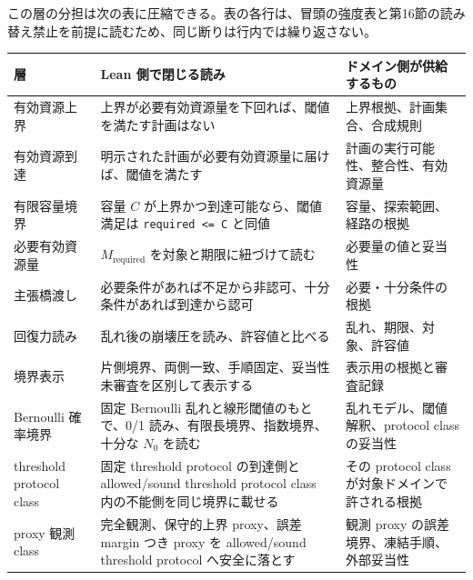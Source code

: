 \documentclass[12pt,a4paper]{article}
\begin{document}
この層の分担は次の表に圧縮できる。表の各行は、冒頭の強度表と第16節の読み替え禁止を前提に読むため、同じ断りは行内では繰り返さない。

{\def\LTcaptype{table} %
\begin{longtable}[]{@{}
  >{\raggedright\arraybackslash}p{}
  >{\raggedright\arraybackslash}p{}
  >{\raggedright\arraybackslash}p{}@{}}
\toprule\noalign{}
\begin{minipage}[b]{\linewidth}\raggedright
層
\end{minipage} & \begin{minipage}[b]{\linewidth}\raggedright
Lean 側で閉じる読み
\end{minipage} & \begin{minipage}[b]{\linewidth}\raggedright
ドメイン側が供給するもの
\end{minipage} \\
\midrule\noalign{}
\endhead
\bottomrule\noalign{}
\endlastfoot
有効資源上界 & 上界が必要有効資源量を下回れば、閾値を満たす計画はない & 上界根拠、計画集合、合成規則 \\
有効資源到達 & 明示された計画が必要有効資源量に届けば、閾値を満たす & 計画の実行可能性、整合性、有効資源量 \\
有限容量境界 & 容量 \(C\) が上界かつ到達可能なら、閾値満足は \texttt{required\ \textless{}=\ C} と同値 & 容量、探索範囲、経路の根拠 \\
必要有効資源量 & \(M_{\mathrm{required}}\) を対象と期限に紐づけて読む & 必要量の値と妥当性 \\
主張橋渡し & 必要条件があれば不足から非認可、十分条件があれば到達から認可 & 必要・十分条件の根拠 \\
回復力読み & 乱れ後の崩壊圧を読み、許容値と比べる & 乱れ、期限、対象、許容値 \\
境界表示 & 片側境界、両側一致、手順固定、妥当性未審査を区別して表示する & 表示用の根拠と審査記録 \\
Bernoulli 確率境界 & 固定 Bernoulli 乱れと線形閾値のもとで、0/1 読み、有限長境界、指数境界、十分な \(N_0\) を読む & 乱れモデル、閾値解釈、protocol class の妥当性 \\
threshold protocol class & 固定 threshold protocol の到達側と allowed/sound threshold protocol class 内の不能側を同じ境界に載せる & その protocol class が対象ドメインで許される根拠 \\
proxy 観測 class & 完全観測、保守的上界 proxy、誤差 margin つき proxy を allowed/sound threshold protocol へ安全に落とす & 観測 proxy の誤差境界、凍結手順、外部妥当性 \\

\end{longtable}}
\end{document}
